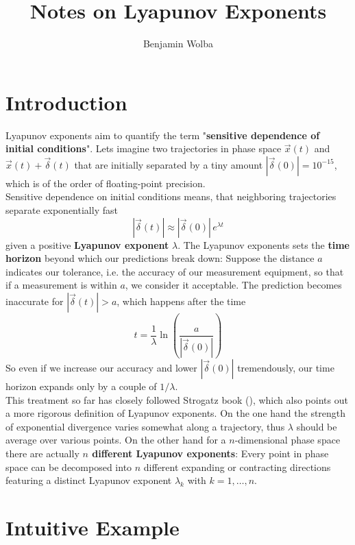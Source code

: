 \documentclass{article}
\title{Notes on Lyapunov Exponents}
\author{Benjamin Wolba}
\begin{document}
\maketitle


\section{Introduction}

Lyapunov exponents aim to quantify the term "\textbf{sensitive dependence of initial conditions}". Lets imagine two trajectories in phase space $\vec{x}(t)$ and $\vec{x}(t) + \vec{\delta}(t)$ that are initially separated by a tiny amount $|\vec{\delta}(0)| = 10^{-15}$, which is of the order of floating-point precision. \\
\indent Sensitive dependence on initial conditions means, that neighboring trajectories separate exponentially fast
%
\begin{equation}
|\vec{\delta}(t)| \approx |\vec{\delta}(0)| \, e^{\lambda t} 
\label{expincrease}
\end{equation}
%
given a positive \textbf{Lyapunov exponent} $\lambda$. The Lyapunov exponents sets the \textbf{time horizon} beyond which our predictions break down: Suppose the distance $a$ indicates our tolerance, i.e. the accuracy of our measurement equipment, so that if a measurement is within $a$, we consider it acceptable. The prediction becomes inaccurate for $|\vec{\delta}(t)| > a$, which happens after the time
%
\begin{equation}
t = \frac{1}{\lambda} \ln \left( \frac{a}{|\vec{\delta}(0)|} \right)
\label{timehorizon}
\end{equation}
% 
So even if we increase our accuracy and lower $|\vec{\delta}(0)|$ tremendously, our time horizon expands only by a couple of $1/\lambda$. \\
\indent This treatment so far has closely followed Strogatz book (\cite[chapter 9.3]{Strogatz1994}), which also points out a more rigorous definition of Lyapunov exponents. On the one hand the strength of exponential divergence varies somewhat along a trajectory, thus $\lambda$ should be average over various points. On the other hand for a $n$-dimensional phase space there are actually \textbf{$n$ different Lyapunov exponents}: Every point in phase space can be decomposed into $n$ different expanding or contracting directions featuring a distinct Lyapunov exponent $\lambda_k$ with $k = 1, \dots, n$.


\section{Intuitive Example}
\end{document}
